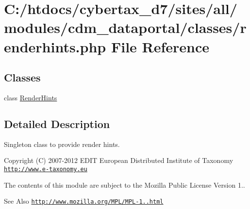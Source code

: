 \hypertarget{renderhints_8php}{\section{C\-:/htdocs/cybertax\-\_\-d7/sites/all/modules/cdm\-\_\-dataportal/classes/renderhints.php File Reference}
\label{renderhints_8php}
}
\subsection*{Classes}
\begin{DoxyCompactItemize}
\item 
class \hyperlink{class_render_hints}{Render\-Hints}
\end{DoxyCompactItemize}


\subsection{Detailed Description}
Singleton class to provide render hints.

\begin{DoxyCopyright}{Copyright}
(C) 2007-\/2012 E\-D\-I\-T European Distributed Institute of Taxonomy \href{http://www.e-taxonomy.eu}{\tt http\-://www.\-e-\/taxonomy.\-eu}
\end{DoxyCopyright}
The contents of this module are subject to the Mozilla Public License Version 1.. \begin{DoxySeeAlso}{See Also}
\href{http://www.mozilla.org/MPL/MPL-1.1.html}{\tt http\-://www.\-mozilla.\-org/\-M\-P\-L/\-M\-P\-L-\/1..\-html} 
\end{DoxySeeAlso}
